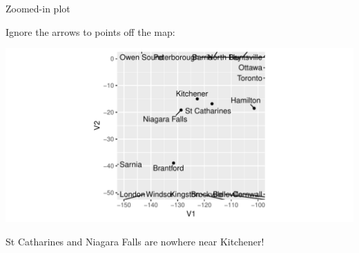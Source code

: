 \begin{frame}[fragile]{Zoomed-in plot}
 
Ignore the arrows to points off the map:

\begin{knitrout}
\color{fgcolor}\begin{kframe}
\begin{alltt}
\end{alltt}
\end{kframe}
\includegraphics[width=\maxwidth]{figure/spal-1} 

\end{knitrout}

  St Catharines and Niagara Falls are nowhere near Kitchener!

  
  
\end{frame}



